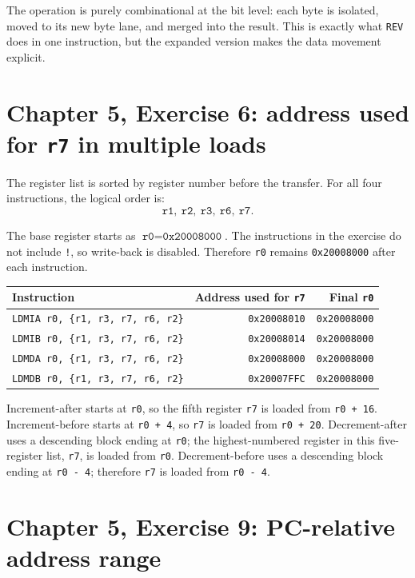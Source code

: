 \documentclass[11pt]{article}
\newcommand{\code}[1]{\texttt{#1}}
\begin{document}
The operation is purely combinational at the bit level: each byte is isolated, moved to its new byte lane, and merged into the result. This is exactly what \code{REV} does in one instruction, but the expanded version makes the data movement explicit.

\section*{Chapter 5, Exercise 6: address used for \code{r7} in multiple loads}

The register list is sorted by register number before the transfer. For all four instructions, the logical order is:
\[
\code{r1},\ \code{r2},\ \code{r3},\ \code{r6},\ \code{r7}.
\]

The base register starts as \(\code{r0} = \code{0x20008000}\). The instructions in the exercise do not include \code{!}, so write-back is disabled. Therefore \code{r0} remains \code{0x20008000} after each instruction.

\begin{center}
\begin{tabular}{l r r}
Instruction & Address used for \code{r7} & Final \code{r0} \\
\hline
\code{LDMIA r0, \{r1, r3, r7, r6, r2\}} & \code{0x20008010} & \code{0x20008000} \\
\code{LDMIB r0, \{r1, r3, r7, r6, r2\}} & \code{0x20008014} & \code{0x20008000} \\
\code{LDMDA r0, \{r1, r3, r7, r6, r2\}} & \code{0x20008000} & \code{0x20008000} \\
\code{LDMDB r0, \{r1, r3, r7, r6, r2\}} & \code{0x20007FFC} & \code{0x20008000} \\
\end{tabular}
\end{center}

Increment-after starts at \code{r0}, so the fifth register \code{r7} is loaded from \code{r0 + 16}. Increment-before starts at \code{r0 + 4}, so \code{r7} is loaded from \code{r0 + 20}. Decrement-after uses a descending block ending at \code{r0}; the highest-numbered register in this five-register list, \code{r7}, is loaded from \code{r0}. Decrement-before uses a descending block ending at \code{r0 - 4}; therefore \code{r7} is loaded from \code{r0 - 4}.

\section*{Chapter 5, Exercise 9: PC-relative address range}
\end{document}
